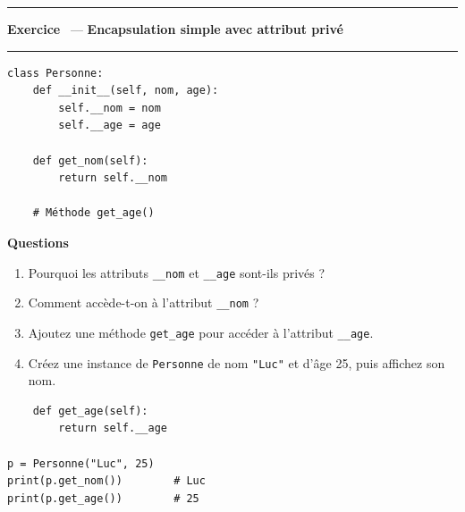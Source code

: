 \documentclass[10pt,a4paper]{article}
\newif\ifcorrige
\newcommand{\py}[1]{\texttt{#1}}
\newcounter{exo}
\newcommand{\exo}[1]{%
  \stepcounter{exo}\par\vspace{4pt}
  \ifcorrige\else\noindent\minipage{\textwidth}\fi
  \noindent\textcolor{qbar}{\rule{2.5pt}{10pt}}\hspace{4pt}%
  \textbf{\color{qbar}Exercice \theexo}\ --- \textbf{#1}%
  \par\nobreak\vspace{-3pt}\noindent\textcolor{qbar!35}{\rule{\textwidth}{0.6pt}}%
  \par\nobreak\vspace{1pt}}
\newenvironment{codebloc}
  {\ifcorrige\else\noindent\minipage[t]{0.50\textwidth}\vspace{0pt}\fi}
  {\ifcorrige\else\endminipage\hfill\fi}
\newenvironment{qbloc}
  {\ifcorrige\else\minipage[t]{0.475\textwidth}\vspace{0pt}\fi
   \textbf{\small Questions}\begin{enumerate}[leftmargin=*,nosep,label=\arabic*.]}
  {\end{enumerate}\ifcorrige\else\endminipage\par\fi}
\newcommand{\rep}[1]{\ifcorrige\par\smallskip{\color{corr}\small#1}\par\smallskip\fi}
\newlength{\zoneadj}\setlength{\zoneadj}{0pt}
\newcommand{\zone}[1][4cm]{%
  \ifcorrige\else
    \par\vspace{2pt}\noindent
    \begin{tcolorbox}[colback=white,colframe=black!45,boxrule=0.5pt,arc=1pt,height={\dimexpr#1-\zoneadj\relax},
      left=4pt,right=4pt,top=2pt,bottom=2pt,
      title={\scriptsize\itshape Réponses},coltitle=black!55,fonttitle=\itshape,
      detach title,before upper={\tcbtitle\par}]\end{tcolorbox}%
    \endminipage\par
  \fi}
\newenvironment{solution}
  {\ifcorrige
     \begin{tcolorbox}[enhanced,breakable,colback=corrbg,colframe=corr,boxrule=0.6pt,arc=1pt,
       left=5pt,right=5pt,top=3pt,bottom=3pt,fontupper=\small,
       title={Corrigé},coltitle=corr,fonttitle=\bfseries\small,detach title,
       before upper={\tcbtitle\par\smallskip}]%
   \else
     \setbox0\vbox\bgroup
   \fi}
  {\ifcorrige\end{tcolorbox}\else\egroup\fi}
\begin{document}
\exo{Encapsulation simple avec attribut privé}
\begin{codebloc}
\begin{lstlisting}
class Personne:
    def __init__(self, nom, age):
        self.__nom = nom
        self.__age = age

    def get_nom(self):
        return self.__nom

    # Méthode get_age()
\end{lstlisting}
\end{codebloc}
\begin{qbloc}
  \item Pourquoi les attributs \py{__nom} et \py{__age} sont-ils privés ?
    \rep{Pour empêcher leur modification directe depuis l'extérieur. L'accès passe par des méthodes,
    ce qui permet de contrôler la lecture et l'écriture et de modifier l'implémentation interne sans
    casser le code qui utilise la classe.}
  \item Comment accède-t-on à l'attribut \py{__nom} ?
    \rep{Par l'accesseur : \py{p.get_nom()}. L'écriture \py{p.__nom} provoque une
    \py{AttributeError}.}
  \item Ajoutez une méthode \py{get_age} pour accéder à l'attribut \py{__age}.
  \item Créez une instance de \py{Personne} de nom \py{"Luc"} et d'âge 25, puis affichez son nom.
\end{qbloc}
\zone[4.0cm]
\begin{solution}
\begin{lstlisting}
    def get_age(self):
        return self.__age

p = Personne("Luc", 25)
print(p.get_nom())        # Luc
print(p.get_age())        # 25
\end{lstlisting}
\end{solution}
\end{document}
